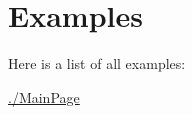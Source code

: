 \section{\-Examples}
\-Here is a list of all examples\-:\begin{DoxyCompactItemize}
\item 
\hyperlink{_8_2MainPage-example}{./\-Main\-Page}
\end{DoxyCompactItemize}
